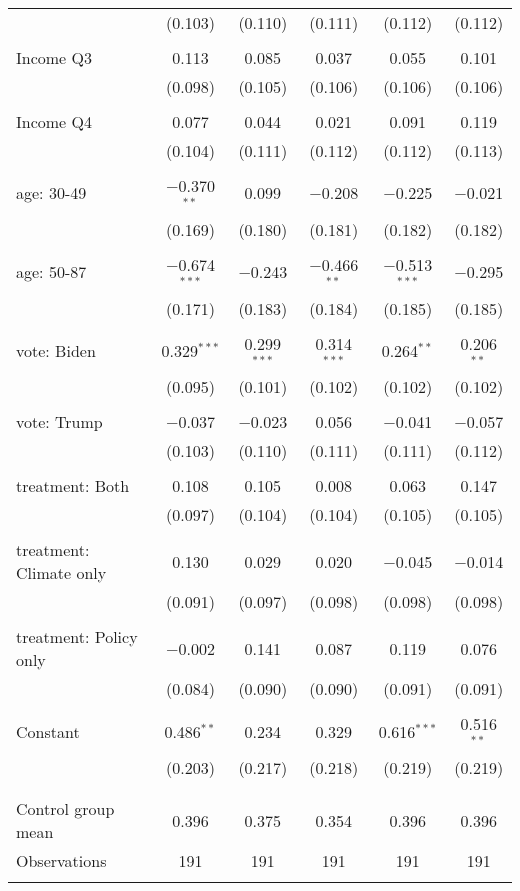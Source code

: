 \begin{tabular}{@{\extracolsep{5pt}}lccccc}
  & (0.103) & (0.110) & (0.111) & (0.112) & (0.112) \\ 
  & & & & & \\ 
 Income Q3 & 0.113 & 0.085 & 0.037 & 0.055 & 0.101 \\ 
  & (0.098) & (0.105) & (0.106) & (0.106) & (0.106) \\ 
  & & & & & \\ 
 Income Q4 & 0.077 & 0.044 & 0.021 & 0.091 & 0.119 \\ 
  & (0.104) & (0.111) & (0.112) & (0.112) & (0.113) \\ 
  & & & & & \\ 
 age: 30-49 & $-$0.370$^{**}$ & 0.099 & $-$0.208 & $-$0.225 & $-$0.021 \\ 
  & (0.169) & (0.180) & (0.181) & (0.182) & (0.182) \\ 
  & & & & & \\ 
 age: 50-87 & $-$0.674$^{***}$ & $-$0.243 & $-$0.466$^{**}$ & $-$0.513$^{***}$ & $-$0.295 \\ 
  & (0.171) & (0.183) & (0.184) & (0.185) & (0.185) \\ 
  & & & & & \\ 
 vote: Biden & 0.329$^{***}$ & 0.299$^{***}$ & 0.314$^{***}$ & 0.264$^{**}$ & 0.206$^{**}$ \\ 
  & (0.095) & (0.101) & (0.102) & (0.102) & (0.102) \\ 
  & & & & & \\ 
 vote: Trump & $-$0.037 & $-$0.023 & 0.056 & $-$0.041 & $-$0.057 \\ 
  & (0.103) & (0.110) & (0.111) & (0.111) & (0.112) \\ 
  & & & & & \\ 
 treatment: Both & 0.108 & 0.105 & 0.008 & 0.063 & 0.147 \\ 
  & (0.097) & (0.104) & (0.104) & (0.105) & (0.105) \\ 
  & & & & & \\ 
 treatment: Climate only & 0.130 & 0.029 & 0.020 & $-$0.045 & $-$0.014 \\ 
  & (0.091) & (0.097) & (0.098) & (0.098) & (0.098) \\ 
  & & & & & \\ 
 treatment: Policy only & $-$0.002 & 0.141 & 0.087 & 0.119 & 0.076 \\ 
  & (0.084) & (0.090) & (0.090) & (0.091) & (0.091) \\ 
  & & & & & \\ 
 Constant & 0.486$^{**}$ & 0.234 & 0.329 & 0.616$^{***}$ & 0.516$^{**}$ \\ 
  & (0.203) & (0.217) & (0.218) & (0.219) & (0.219) \\ 
  & & & & & \\ 
\hline \\[-1.8ex] 
Control group mean & 0.396 & 0.375 & 0.354 & 0.396 & 0.396 \\ 
Observations & 191 & 191 & 191 & 191 & 191 \\ 
\hline 
\hline \\[-1.8ex] 
\end{tabular} 
